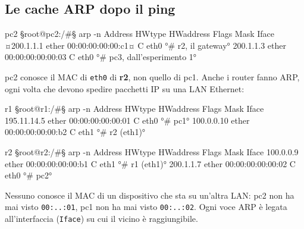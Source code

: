 \subsection{Le cache ARP dopo il ping}
\begin{terminale}{pc2}
§root@pc2:/#§ arp -n
Address        HWtype  HWaddress            Flags Mask  Iface
¤200.1.1.1      ether   00:00:00:00:00:c1¤    C           eth0     °# r2, il gateway°
200.1.1.3      ether   00:00:00:00:00:03    C           eth0     °# pc3, dall'esperimento 1°
\end{terminale}
pc2 conosce il MAC di \texttt{eth0} di \textbf{r2}, non quello di pc1. Anche i router fanno ARP, ogni volta che devono spedire pacchetti IP su una LAN Ethernet:
\begin{terminale}{r1}
§root@r1:/#§ arp -n
Address        HWtype  HWaddress            Flags Mask  Iface
195.11.14.5    ether   00:00:00:00:00:01    C           eth0     °# pc1°
100.0.0.10     ether   00:00:00:00:00:b2    C           eth1     °# r2 (eth1)°
\end{terminale}
\begin{terminale}{r2}
§root@r2:/#§ arp -n
Address        HWtype  HWaddress            Flags Mask  Iface
100.0.0.9      ether   00:00:00:00:00:b1    C           eth1     °# r1 (eth1)°
200.1.1.7      ether   00:00:00:00:00:02    C           eth0     °# pc2°
\end{terminale}
\begin{tecnica}
Nessuno conosce il MAC di un dispositivo che sta su un'altra LAN: pc2 non ha mai visto \texttt{00:..:01}, pc1 non ha mai visto \texttt{00:..:02}. Ogni voce ARP è legata all'interfaccia (\texttt{Iface}) su cui il vicino è raggiungibile.
\end{tecnica}

